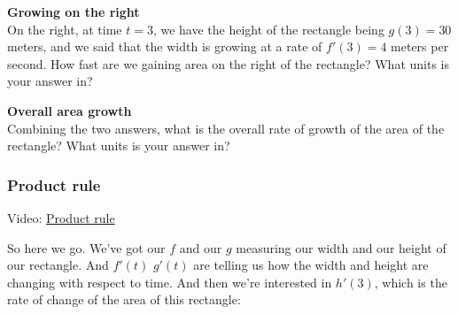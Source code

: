 \documentclass[pdftex, brazil, 12pt, twoside]{article}
\begin{document}
\begin{exercise}
  \textbf{Growing on the right}\\%
  On the right, at time $t=3$, we have the height of the rectangle being $g(3) = 30$
  meters, and we said that the width is growing at a rate of $f'(3) = 4$ meters per
  second. How fast are we gaining area on the right of the rectangle? What units
  is your answer in?
  \begin{figure}
    \begin{center}
    \end{center}
  \end{figure}
\end{exercise}

\begin{exercise}
  \textbf{Overall area growth}\\%
  Combining the two answers, what is the overall rate of growth of the area of
  the rectangle? What units is your answer in?
\end{exercise}

\subsubsection{Product rule}
\label{u2-product-rule-product-rule}

Video: \href{https://www.youtube.com/watch?v=es5lhhpMCkQ}{Product rule}

So here we go.
We've got our $f$ and our $g$ measuring
our width and our height of our rectangle.
And $f'(t)$ $g'(t)$ are telling us
how the width and height are changing with respect to time.
And then we're interested in $h'(3)$,
which is the rate of change of the area of this rectangle:
\end{document}

